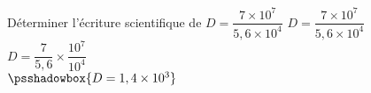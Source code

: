\begin{methode*1}
    \exercice
    Déterminer l'écriture scientifique de $D=\dfrac{7\times 10^7}{5,6 \times 10^4}$
    \correction
    $D=\dfrac{7\times 10^7}{5,6 \times 10^4}$\\
    $D=\dfrac{7}{5,6}\times \dfrac{10^7}{10^4}$\\
    $\psshadowbox{D=1,4\times 10^3}$
\end{methode*1}


